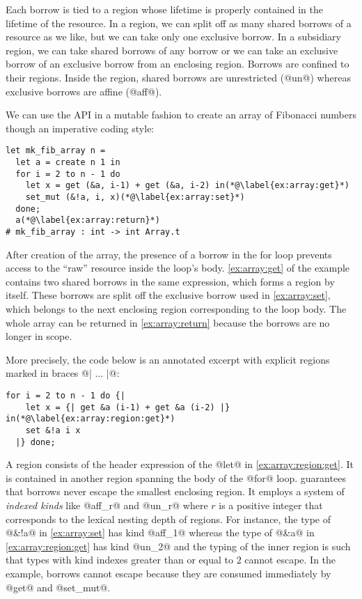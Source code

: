 Each borrow is tied to a region whose lifetime is properly
contained in the lifetime of the resource.
In a region, we can split off as many shared borrows of a resource as
we like, but we can take only one exclusive borrow. In a
subsidiary region, we can take shared borrows of any
borrow or we can take an exclusive borrow of an exclusive borrow from an
enclosing region. Borrows are confined to their regions. Inside the region,
shared borrows are unrestricted (@un@) whereas exclusive
borrows are affine (@aff@).

We can use the API in a mutable fashion
to create an
array of Fibonacci numbers though an imperative coding style:
\begin{lstlisting}
let mk_fib_array n =
  let a = create n 1 in
  for i = 2 to n - 1 do
    let x = get (&a, i-1) + get (&a, i-2) in(*@\label{ex:array:get}*)
    set_mut (&!a, i, x)(*@\label{ex:array:set}*)
  done;
  a(*@\label{ex:array:return}*)
# mk_fib_array : int -> int Array.t
\end{lstlisting}

After
creation of the array, the presence of a borrow in the for loop
prevents access to the ``raw'' resource inside the loop's
body. \cref{ex:array:get} of the example contains two shared borrows
in the same expression, which forms a region by itself. These borrows
are split off the exclusive borrow used in \cref{ex:array:set}, which
belongs to the next enclosing region corresponding to the loop body.
The whole array can be returned in \cref{ex:array:return} because  the
borrows are no longer in scope. 

More precisely, the code below is an annotated excerpt with explicit regions
marked in braces @{| ... |}@:

\begin{lstlisting}[firstnumber=3]
  for i = 2 to n - 1 do {|
    let x = {| get &a (i-1) + get &a (i-2) |} in(*@\label{ex:array:region:get}*)
    set &!a i x
  |} done;
\end{lstlisting}

A region consists of the header expression of the @let@ in
\cref{ex:array:region:get}. It is contained in another region
spanning the body of the @for@ loop. \lang guarantees that borrows
never escape the smallest enclosing region. It employs a system of
\emph{indexed kinds} like @aff_r@ and @un_r@ where
$r$ is a positive integer that corresponds to the lexical nesting
depth of regions. For instance, the type of @&!a@ in
\cref{ex:array:set} has kind @aff_1@ whereas the type of
@&a@ in \cref{ex:array:region:get} has kind
@un_2@ and the typing of the inner region is such that types with
kind indexes greater than or equal to $2$ cannot escape.
In the example, borrows cannot escape  because they are consumed
immediately by @get@ and @set_mut@.

